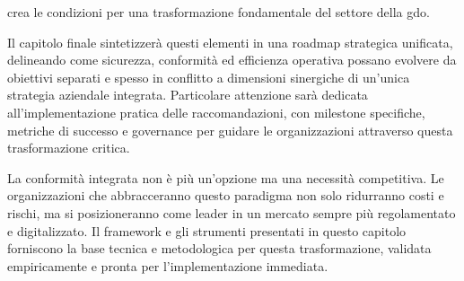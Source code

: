 crea le condizioni per una trasformazione fondamentale del settore della \gls{gdo}.

Il capitolo finale sintetizzerà questi elementi in una roadmap strategica unificata, delineando come sicurezza, conformità ed efficienza operativa possano evolvere da obiettivi separati e spesso in conflitto a dimensioni sinergiche di un'unica strategia aziendale integrata. Particolare attenzione sarà dedicata all'implementazione pratica delle raccomandazioni, con milestone specifiche, metriche di successo e governance per guidare le organizzazioni attraverso questa trasformazione critica.

La conformità integrata non è più un'opzione ma una necessità competitiva. Le organizzazioni che abbracceranno questo paradigma non solo ridurranno costi e rischi, ma si posizioneranno come leader in un mercato sempre più regolamentato e digitalizzato. Il framework e gli strumenti presentati in questo capitolo forniscono la base tecnica e metodologica per questa trasformazione, validata empiricamente e pronta per l'implementazione immediata.
\clearpage
\printbibliography[
    heading=subbibliography,
    title={Riferimenti Bibliografici del Capitolo 4},
]

